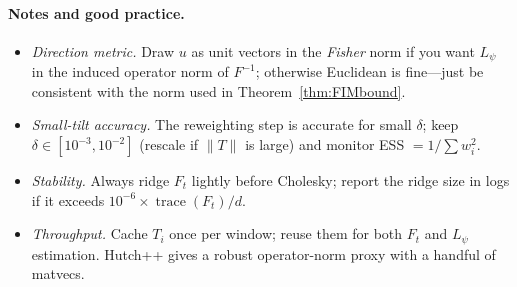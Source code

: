 \paragraph{Notes and good practice.}
\begin{itemize}[leftmargin=*]
\item \emph{Direction metric.} Draw $u$ as unit vectors in the \emph{Fisher} norm if you want \(L_\psi\) in the induced operator norm of \(F^{-1}\); otherwise Euclidean is fine---just be consistent with the norm used in Theorem~\ref{thm:FIMbound}.
\item \emph{Small-tilt accuracy.} The reweighting step is accurate for small \(\delta\); keep \(\delta\in[10^{-3},10^{-2}]\) (rescale if \(\|T\|\) is large) and monitor ESS \(= 1/\sum w_i^2\).
\item \emph{Stability.} Always ridge \(F_t\) lightly before Cholesky; report the ridge size in logs if it exceeds \(10^{-6}\times\operatorname{trace}(F_t)/d\).
\item \emph{Throughput.} Cache \(T_i\) once per window; reuse them for both \(F_t\) and \(L_\psi\) estimation. Hutch++ gives a robust operator-norm proxy with a handful of matvecs.
\end{itemize}

